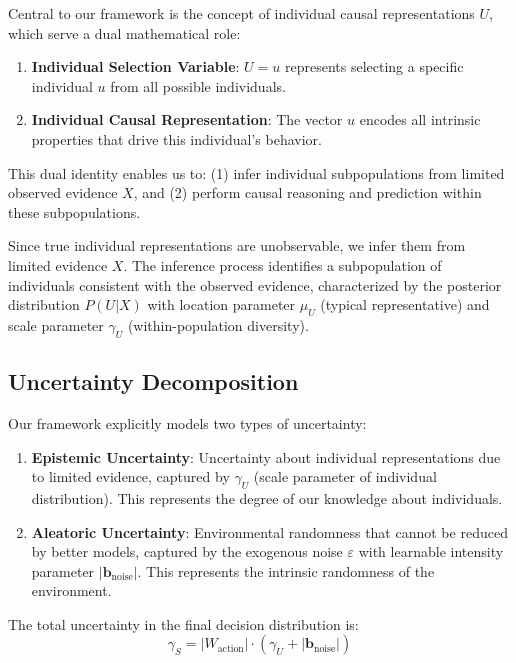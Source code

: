 \documentclass[conference]{IEEEtran}
\begin{document}
Central to our framework is the concept of individual causal representations $U$, which serve a dual mathematical role:

\begin{enumerate}
\item \textbf{Individual Selection Variable}: $U = u$ represents selecting a specific individual $u$ from all possible individuals.

\item \textbf{Individual Causal Representation}: The vector $u$ encodes all intrinsic properties that drive this individual's behavior.
\end{enumerate}

This dual identity enables us to: (1) infer individual subpopulations from limited observed evidence $X$, and (2) perform causal reasoning and prediction within these subpopulations.

Since true individual representations are unobservable, we infer them from limited evidence $X$. The inference process identifies a subpopulation of individuals consistent with the observed evidence, characterized by the posterior distribution $P(U|X)$ with location parameter $\mu_U$ (typical representative) and scale parameter $\gamma_U$ (within-population diversity).

\subsection{Uncertainty Decomposition}

Our framework explicitly models two types of uncertainty:

\begin{enumerate}
\item \textbf{Epistemic Uncertainty}: Uncertainty about individual representations due to limited evidence, captured by $\gamma_U$ (scale parameter of individual distribution). This represents the degree of our knowledge about individuals.

\item \textbf{Aleatoric Uncertainty}: Environmental randomness that cannot be reduced by better models, captured by the exogenous noise $\varepsilon$ with learnable intensity parameter $|\mathbf{b}_{\text{noise}}|$. This represents the intrinsic randomness of the environment.
\end{enumerate}

The total uncertainty in the final decision distribution is:
\begin{equation}
\gamma_S = |W_{\text{action}}| \cdot (\gamma_U + |\mathbf{b}_{\text{noise}}|)
\end{equation}
\end{document}
